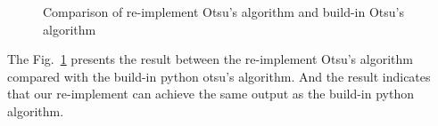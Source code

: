 \documentclass[12pt]{article}
\begin{document}
\begin{enumerate}[leftmargin=\labelsep]
\begin{enumerate}
\begin{figure}[H]
        \quad
        \caption{Comparison of re-implement Otsu's algorithm and build-in Otsu's algorithm}
        \label{Q3_a}
    \end{figure}

The Fig.~\ref{Q3_a} presents the result between the re-implement Otsu's algorithm compared with the build-in python otsu's algorithm. 
And the result indicates that our re-implement can achieve the same output as the build-in python algorithm.



\end{enumerate}
\end{enumerate}
\end{document}
